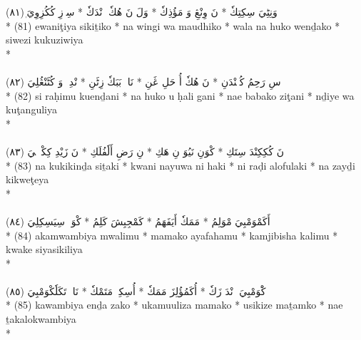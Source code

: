 \documentclass[a4paper, 12pt]{report}
\begin{document}
\begin{center}
\textarabic{(٨١) \textcolor{mygreen}{ٖوَنِٹِيَ سِكِتِكٗ  * نَ وِنْڠِ وَ مَؤُذِكٗ  * وَلَ نَ هُكٗ وٖنْدَكٗ  * سِوٖزِ كُكُزِوِيَ }} \\* 
(81) ewaniţiya sikiṯiko  * na wingi wa maudhiko  * wala na huko wenḏako  * siwezi kukuziwiya  \\* 
 \\ 
\\[8mm] 

\textarabic{(٨٢) \textcolor{mygreen}{سِ رَحِمُ كُئٖنْدَنِ  * نَ هُكٗ أُ حَلِ ڠَنِ  * نَاءٖ بَبَكٗ زِٹَنِ  * نْدِيٖ وَ كُٹَنْڠُلِيَ }} \\* 
(82) si raḥimu kuenḏani  * na huko u ḥali gani  * nae babako ziţani  * nḏiye wa kuţanguliya  \\* 
 \\ 
\\[8mm] 

\textarabic{(٨٣) \textcolor{mygreen}{نَ كُكِكِنْدَ سِتَكِ  * كْوَنِ نَيُوَ نِ هَكِ  * نِ رَضِ أَلٗفُلَكِ  * نَ زَيْدِ كِكْوٖٹٖيَ }} \\* 
(83) na kukikinḏa siṯaki  * kwani nayuwa ni haki  * ni raḍi alofulaki  * na zayḏi kikweţeya  \\* 
 \\ 
\\[8mm] 

\textarabic{(٨٤) \textcolor{mygreen}{أَكَمْوَمْبِيَ مْوَلِمُ  * مَمَكٗ أَيَفَهَمُ  * كَمْجِبِشَ كَلِمُ  * كْوَكٖ سِيَسِكِلِيَ }} \\* 
(84) akamwambiya mwalimu  * mamako ayafahamu  * kamjibisha kalimu  * kwake siyasikiliya  \\* 
 \\ 
\\[8mm] 

\textarabic{(٨٥) \textcolor{mygreen}{كَْوَمْبِيَ إٖنْدَ زَكٗ  * أُكَمُؤُلِزَ مَمَكٗ  * أُسِكِزٖ مَتَمْكٗ  * نَاءٖ تَكَلٗكْوَمْبِيَ }} \\* 
(85) kawambiya enḏa zako  * ukamuuliza mamako  * usikize maṯamko  * nae ṯakalokwambiya  \\* 
 \\ 
\\[8mm] 


\end{center}
\end{document}
